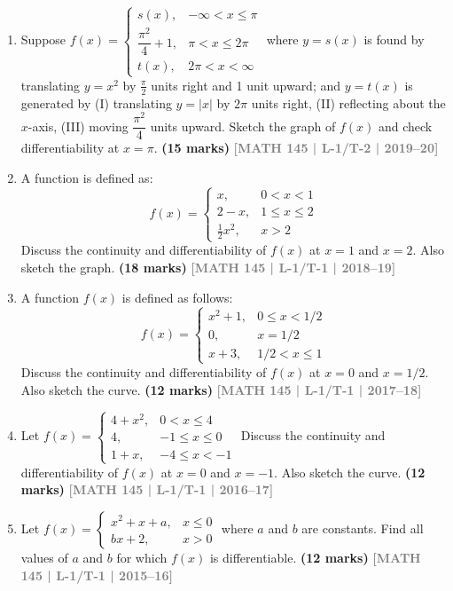 \documentclass[12pt,a3paper]{article}
\newcommand{\yr}[1]{\hfill\textcolor{gray}{\small\textbf{[#1]}}}
\newcommand{\mk}[1]{\textcolor{orange!70!black}{\small\textbf{(#1 marks)}}}
\begin{document}
\begin{enumerate}
\item Suppose $f(x)=\begin{cases}s(x), & -\infty<x\le\pi\\ \dfrac{\pi^{2}}{4}+1, & \pi<x\le 2\pi\\ t(x), & 2\pi<x<\infty\end{cases}$ where $y=s(x)$ is found by translating $y=x^{2}$ by $\frac{\pi}{2}$ units right and 1 unit upward; and $y=t(x)$ is generated by (I) translating $y=|x|$ by $2\pi$ units right, (II) reflecting about the $x$-axis, (III) moving $\dfrac{\pi^{2}}{4}$ units upward. Sketch the graph of $f(x)$ and check differentiability at $x=\pi$.
\mk{15} \yr{MATH 145 | L-1/T-2 | 2019--20}

\item A function is defined as:
\[
f(x)=\begin{cases}x, & 0<x<1\\ 2-x, & 1\le x\le 2\\ \tfrac{1}{2}x^{2}, & x>2\end{cases}
\]
Discuss the continuity and differentiability of $f(x)$ at $x=1$ and $x=2$. Also sketch the graph.
\mk{18} \yr{MATH 145 | L-1/T-1 | 2018--19}

\item A function $f(x)$ is defined as follows:
\[
f(x)=\begin{cases}x^{2}+1, & 0\le x<1/2\\ 0, & x=1/2\\ x+3, & 1/2<x\le 1\end{cases}
\]
Discuss the continuity and differentiability of $f(x)$ at $x=0$ and $x=1/2$. Also sketch the curve.
\mk{12} \yr{MATH 145 | L-1/T-1 | 2017--18}

\item Let $f(x)=\begin{cases}4+x^{2}, & 0<x\le 4\\ 4, & -1\le x\le 0\\ 1+x, & -4\le x<-1\end{cases}$ Discuss the continuity and differentiability of $f(x)$ at $x=0$ and $x=-1$. Also sketch the curve.
\mk{12} \yr{MATH 145 | L-1/T-1 | 2016--17}

\item Let $f(x)=\begin{cases}x^{2}+x+a, & x\le 0\\ bx+2, & x>0\end{cases}$ where $a$ and $b$ are constants. Find all values of $a$ and $b$ for which $f(x)$ is differentiable.
\mk{12} \yr{MATH 145 | L-1/T-1 | 2015--16}


\end{enumerate}
\end{document}
